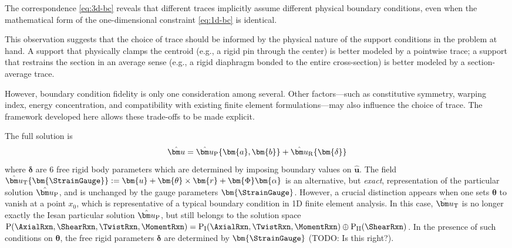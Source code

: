 \begin{remark}
The correspondence \eqref{eq:3d-bc} reveals that different traces implicitly 
assume different physical boundary conditions, even when the mathematical 
form of the one-dimensional constraint \eqref{eq:1d-bc} is identical. 

This observation suggests that the choice of trace should be informed by 
the physical nature of the support conditions in the problem at hand. 
A  support that physically clamps the centroid (e.g., a rigid pin through the 
center) is better modeled by a pointwise trace; a support that restrains 
the section in an average sense (e.g., a rigid diaphragm bonded to the 
entire cross-section) is better modeled by a section-average trace.

However, boundary condition fidelity is only one consideration among several. 
Other factors---such as constitutive symmetry, warping index, energy 
concentration, and compatibility with existing finite element 
formulations---may also influence the choice of trace. 
The framework 
developed here allows these trade-offs to be made explicit.
\end{remark}

\begin{remark}
The full solution is 
$$
\hat{\bm u} = \hat{\bm u}_{\rm P}\{\bm{a},\bm{b}\} + \hat{\bm u}_{\rm R}\{\bm{\delta}\}
$$
where $\bm{\delta}$ are 6 free rigid body parameters which are determined by imposing boundary values on $\hat{\bm u}$. 
The field $\hat{\bm u}_{\rm T}\{\bm{\StrainGauge}\} := \bm{u} + \bm{\theta}\times \bm{r} + \bm{\Phi} \bm{\alpha}$ is an alternative, but \emph{exact}, representation of the particular solution $\hat{\bm u}_{\rm P}$, and is unchanged by the gauge parameters $\bm{\StrainGauge}$. 
However, a crucial distinction appears when one sets $\bm{\theta}$ to vanish at a point $x_0$, which is representative of a typical boundary condition in 1D finite element analysis. 
In this case, $\hat{\bm u}_{\rm T}$ is no longer exactly the Iesan particular solution $\hat{\bm u}_{\rm P}$, but still belongs to the solution space $\mathrm{P}(\AxialRxn,\ShearRxn,\TwistRxn,\MomentRxn) = \mathrm{P}_{\rm I}(\AxialRxn,\TwistRxn,\MomentRxn) \oplus \mathrm{P}_{\rm II}(\ShearRxn)$.
In the presence of such conditions on $\bm{\theta}$, the  free rigid parameters $\bm{\delta}$ are determined by $\bm{\StrainGauge}$ (TODO: Is this right?). 
\end{remark}


